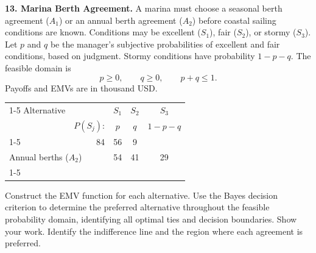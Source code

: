\noindent\begin{minipage}[t][0.94\textheight][t]{\textwidth}
\textbf{13. Marina Berth Agreement.} A marina must choose a seasonal berth agreement ($A_1$) or an annual
berth agreement ($A_2$) before coastal sailing conditions are known.
Conditions may be excellent ($S_1$), fair ($S_2$), or stormy ($S_3$).
Let $p$ and $q$ be the manager's subjective probabilities of excellent
and fair conditions, based on judgment. Stormy conditions have
probability $1-p-q$. The feasible domain is
\[
p\geq0,\qquad q\geq0,\qquad p+q\leq1.
\]
Payoffs and EMVs are in thousand USD.

\begin{center}
		\renewcommand{\arraystretch}{1.3}
		\small
		\begin{tabular}{lr@{\qquad}ccc}
			\cmidrule{1-5}
			Alternative & & $S_1$ & $S_2$ & $S_3$ \\
			& $P(S_j)$: & $p$ & $q$ & $1-p-q$ \\
			\cmidrule{1-5}
			\multicolumn{2}{l}{Seasonal berths ($A_1$)} & 84 & 56 & 9 \\
			\multicolumn{2}{l}{Annual berths ($A_2$)} & 54 & 41 & 29 \\
			\cmidrule{1-5}
		\end{tabular}
	\end{center}

Construct the EMV function for each alternative. Use the Bayes decision criterion to determine the preferred alternative throughout the feasible probability domain, identifying all optimal ties and decision boundaries. Show your work. Identify the indifference line and the region where each agreement is preferred.
\par\vfill
\end{minipage}\par


